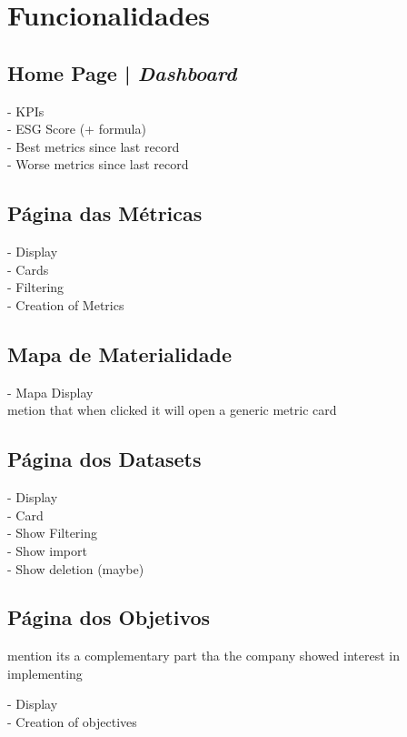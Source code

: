 \section{Funcionalidades}

\subsection{Home Page | \textit{Dashboard}}

- KPIs \\
- ESG Score (+ formula) \\
- Best metrics since last record \\
- Worse metrics since last record \\

\subsection{Página das Métricas}

- Display \\
- Cards \\
- Filtering \\
- Creation of Metrics \\

\subsection{Mapa de Materialidade}

- Mapa Display \\
metion that when clicked it will open a generic metric card

\subsection{Página dos Datasets}

- Display \\
- Card \\
- Show Filtering \\
- Show import \\
- Show deletion (maybe) \\

\subsection{Página dos Objetivos}

mention its a complementary part tha the company showed interest in implementing

- Display \\
- Creation of objectives \\

